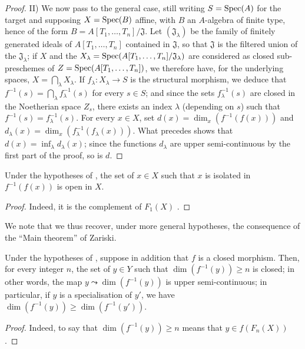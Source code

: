 \begin{proof}
II) We now pass to the general case, still writing $S=\operatorname{Spec}(A)$ for the target and supposing $X=\operatorname{Spec}(B)$ affine, with $B$ an $A$-algebra of finite type, hence of the form
$B=A[T_1,\ldots,T_n]/\mathfrak{J}$.
Let $(\mathfrak{J}_\lambda)$ be the family of finitely generated ideals of $A[T_1,\ldots,T_n]$ contained in $\mathfrak{J}$, so that $\mathfrak{J}$ is the filtered union of the $\mathfrak{J}_\lambda$; if $X$ and the $X_\lambda=\operatorname{Spec}(A[T_1,\ldots,T_n]/\mathfrak{J}_\lambda)$ are considered as closed sub-preschemes of $Z=\operatorname{Spec}(A[T_1,\ldots,T_n])$, we therefore have, for the underlying spaces, $X=\bigcap_\lambda X_\lambda$.
If $f_\lambda:X_\lambda\to S$ is the structural morphism, we deduce that $f^{-1}(s)=\bigcap_\lambda f_\lambda^{-1}(s)$ for every $s\in S$; and since the sets $f_\lambda^{-1}(s)$ are closed in the Noetherian space $Z_s$, there exists an index $\lambda$ (depending on $s$) such that $f^{-1}(s)=f_\lambda^{-1}(s)$.
For every $x\in X$, set $d(x)=\dim_x(f^{-1}(f(x)))$ and $d_\lambda(x)=\dim_x(f_\lambda^{-1}(f_\lambda(x)))$. What precedes shows that $d(x)=\inf_\lambda d_\lambda(x)$; since the functions $d_\lambda$ are upper semi-continuous by the first part of the proof, so is $d$.
\end{proof}

\begin{corollary}[13.1.4]
\label{IV.13.1.4}
Under the hypotheses of , the set of $x\in X$ such that $x$ is isolated in $f^{-1}(f(x))$ is open in $X$.
\end{corollary}

\begin{proof}
Indeed, it is the complement of $F_1(X)$ .
\end{proof}

We note that we thus recover, under more general hypotheses, the consequence  of the ``Main theorem'' of Zariski.

\begin{corollary}[13.1.5]
\label{IV.13.1.5}
Under the hypotheses of , suppose in addition that $f$ is a closed morphism.
Then, for every integer $n$, the set of $y\in Y$ such that $\dim(f^{-1}(y))\geq n$ is closed; in other words, the map $y\leadsto\dim(f^{-1}(y))$ is upper semi-continuous; in particular, if $y$ is a specialisation of $y'$, we have $\dim(f^{-1}(y))\geq\dim(f^{-1}(y'))$.
\end{corollary}

\begin{proof}
Indeed, to say that $\dim(f^{-1}(y))\geq n$ means that $y\in f(F_n(X))$ .
\end{proof}

